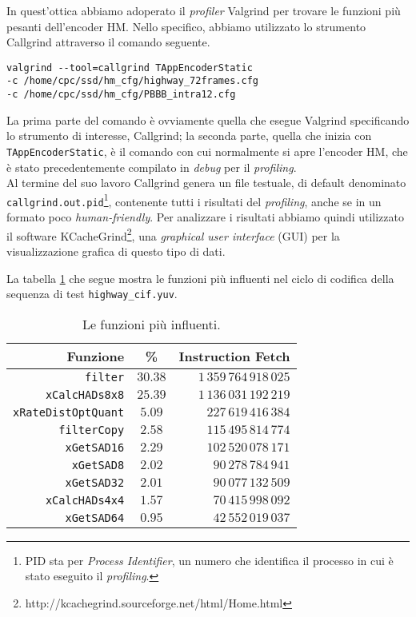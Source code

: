In quest'ottica abbiamo adoperato il \emph{profiler} Valgrind per trovare le 
funzioni più pesanti dell'encoder HM. Nello specifico, abbiamo utilizzato lo 
strumento Callgrind attraverso il comando seguente. \\

\begin{lstlisting}[breaklines]
valgrind --tool=callgrind TAppEncoderStatic 
-c /home/cpc/ssd/hm_cfg/highway_72frames.cfg 
-c /home/cpc/ssd/hm_cfg/PBBB_intra12.cfg
\end{lstlisting}

La prima parte del comando è ovviamente quella che esegue Valgrind specificando 
lo strumento di interesse, Callgrind; la seconda parte, quella che inizia con 
\verb|TAppEncoderStatic|, è il comando con cui normalmente si apre l'encoder 
HM, che è stato precedentemente compilato in \emph{debug} per il 
\emph{profiling}. \\
Al termine del suo lavoro Callgrind genera un file testuale, di default 
denominato \verb|callgrind.out.pid|\footnote{PID sta per \textit{Process 
Identifier}, un numero che identifica il processo in cui è stato eseguito il 
\emph{profiling}.}, 
contenente tutti i risultati del \emph{profiling}, anche se in un formato poco 
\emph{human-friendly}. 
Per analizzare i risultati abbiamo quindi utilizzato il software 
KCacheGrind\footnote{http://kcachegrind.sourceforge.net/html/Home.html}, una 
\textit{graphical user interface} (GUI) per la visualizzazione grafica di 
questo tipo di dati.

La tabella \ref{tabel-functions} che segue mostra le funzioni più influenti nel 
ciclo di codifica della sequenza di test \verb|highway_cif.yuv|. \\

\begin{table}[H]
  \centering
  \begin{tabular}{|r|c|r|}
    \hline
    Funzione & \% & Instruction Fetch \\ \hline \hline \hline
    \verb|filter|            & $30.38$ & $1\,359\,764\,918\,025$ \\ \hline
    \verb|xCalcHADs8x8|      & $25.39$ & $1\,136\,031\,192\,219$ \\ \hline
    \verb|xRateDistOptQuant| & $ 5.09$ & $   227\,619\,416\,384$ \\ \hline
    \verb|filterCopy|        & $ 2.58$ & $   115\,495\,814\,774$ \\ \hline
    \verb|xGetSAD16|         & $ 2.29$ & $   102\,520\,078\,171$ \\ \hline
    \verb|xGetSAD8|          & $ 2.02$ & $    90\,278\,784\,941$ \\ \hline
    \verb|xGetSAD32|         & $ 2.01$ & $    90\,077\,132\,509$ \\ \hline
    \verb|xCalcHADs4x4|      & $ 1.57$ & $    70\,415\,998\,092$ \\ \hline
    \verb|xGetSAD64|         & $ 0.95$ & $    42\,552\,019\,037$ \\ \hline
  \end{tabular}
  \caption{Le funzioni più influenti.}
  \label{tabel-functions}
\end{table}

